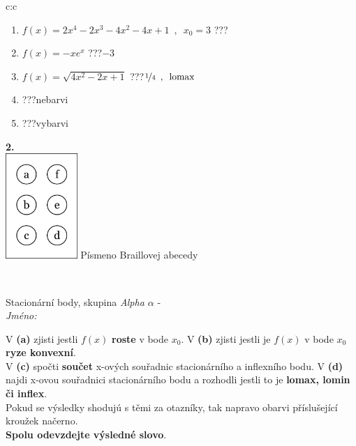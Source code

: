 \documentclass[10pt]{report}
\begin{document}
\begin{tabular}{c:c}
\begin{minipage}[c][104.5mm][t]{0.5\linewidth}
\begin{center}
\begin{minipage}{0.79\linewidth}
\begin{center}
\begin{varwidth}{\linewidth}
\begin{enumerate}
\item $f(x)=2x^4-2x^3-4x^2-4x+1\enspace , \enspace x_0=3$\quad \dotfill\; ???\;\dotfill \quad {}
\item $f(x)=-xe^{x}$\quad \dotfill\; ???\;\dotfill \quad $-3$
\item $f(x)=\sqrt{4x^2-2x+1}$\quad \dotfill\; ???\;\dotfill \quad $\nicefrac{1}{4}\enspace , \enspace\mathrm{lomax}$
\item \quad \dotfill\; ???\;\dotfill \quad nebarvi
\item \quad \dotfill\; ???\;\dotfill \quad vybarvi
\end{enumerate}
\end{varwidth}
\end{center}
\end{minipage}
\begin{minipage}{0.20\linewidth}
\begin{center}
{\Huge\bfseries 2.} \\[2mm]
\includegraphics[height=40mm]{../images/braille.png}
{\small Písmeno Braillovej abecedy}
\end{center}
\end{minipage}
\end{center}
\end{minipage}
\\ \hdashline
\begin{minipage}[c][104.5mm][t]{0.5\linewidth}
\begin{center}
\vspace{7mm}
{\huge Stacionární body, skupina \textit{Alpha $\alpha$} -}\\[5mm]
\textit{Jméno:}\phantom{xxxxxxxxxxxxxxxxxxxxxxxxxxxxxxxxxxxxxxxxxxxxxxxxxxxxxxxxxxxxxxxxx}\\[5mm]
\begin{minipage}{0.95\linewidth}
\begin{center}
{\small V \textbf{(a)} zjisti jestli $f(x)$ \textbf{roste} v bode $x_0$. V \textbf{(b)} zjisti jestli je $f(x)$ v bode $x_0$ \textbf{ryze konvexní}.\\V \textbf{(c)} spočti \textbf{součet} x-ových souřadnic stacionárního a inflexního bodu. V \textbf{(d)} najdi x-ovou souřadnici stacionárního bodu a rozhodli jestli to je \textbf{lomax, lomin či inflex}.\\Pokud se výsledky shodujú s těmi za otazníky, tak napravo obarvi příslušející kroužek načerno.\\\textbf{Spolu odevzdejte výsledné slovo}}.

\end{center}
\end{minipage}
\end{center}
\end{minipage}
\end{tabular}
\end{document}
